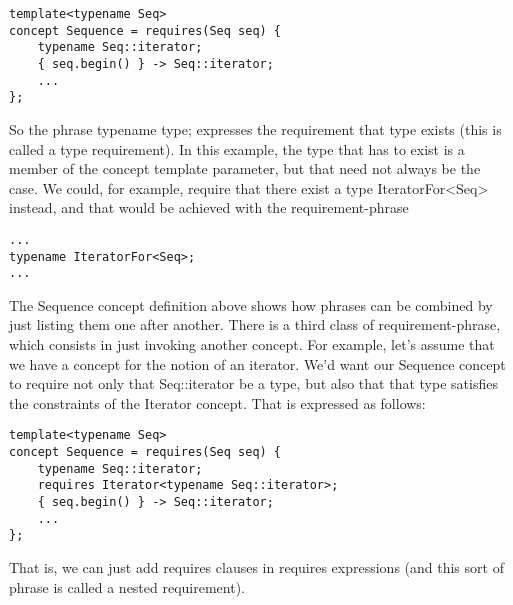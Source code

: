 \begin{lstlisting}[style=styleCXX]
template<typename Seq>
concept Sequence = requires(Seq seq) {
	typename Seq::iterator;
	{ seq.begin() } -> Seq::iterator;
	...
};
\end{lstlisting}

So the phrase typename type; expresses the requirement that type exists (this is called a type requirement). In this example, the type that has to exist is a member of the concept template parameter, but that need not always be the case. We could, for example, require that there exist a type IteratorFor<Seq> instead, and that would be achieved with the requirement-phrase

\begin{lstlisting}[style=styleCXX]
...
typename IteratorFor<Seq>;
...
\end{lstlisting}

The Sequence concept definition above shows how phrases can be combined by just listing them one after another. There is a third class of  requirement-phrase, which consists in just invoking another concept. For example, let’s assume that we have a concept for the notion of an iterator. We’d want our Sequence concept to require not only that Seq::iterator be a type, but also that that type satisfies the constraints of the Iterator concept. That is expressed as follows:

\begin{lstlisting}[style=styleCXX]
template<typename Seq>
concept Sequence = requires(Seq seq) {
	typename Seq::iterator;
	requires Iterator<typename Seq::iterator>;
	{ seq.begin() } -> Seq::iterator;
	...
};
\end{lstlisting}

That is, we can just add requires clauses in requires expressions (and this sort of phrase is called a nested requirement).
















